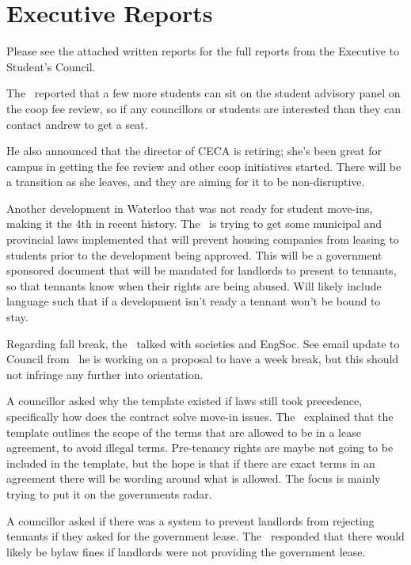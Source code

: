 \section*{Executive Reports}

Please see the attached written reports for the full reports from the Executive
to Student's Council. 

\begin{information}

    The \vpe\ reported that a few more students can sit on the student advisory
    panel on the coop fee review, so if any councillors or students 
    are interested than they can contact andrew to get a seat.

    He also announced that the director of CECA is retiring; she's been great 
    for campus in getting the fee review and other coop initiatives started. 
    There will be a transition as she leaves, and they are aiming for it to be
    non-disruptive.

    Another development in Waterloo that was not ready for student move-ins,
    making it the 4th in recent history. The \vpe\ is trying to get
    some municipal and provincial laws implemented that will prevent housing
    companies from leasing to students prior to the development being approved. 
    This will be a government sponsored document that will be mandated for 
    landlords to present to tennants, so that tennants know when their rights 
    are being abused. Will likely include language such that if a development 
    isn't ready a tennant won't be bound to stay.

    Regarding fall break, the \vped\ talked with societies and EngSoc. See 
    email update to Council from \andrewc\, he is working on a proposal to 
    have a week break, but this should not infringe any further into 
    orientation. 

    A councillor asked why the template existed if laws still took precedence,  
    specifically how does the contract solve move-in issues. 
    The \vpe\ explained that the template outlines the scope of the terms
    that are allowed to be in a lease agreement, to avoid illegal terms.
    Pre-tenancy rights are maybe not going to be included in the template, but 
    the hope is that if there are exact terms in an agreement there will be
    wording around what is allowed. The focus is mainly trying to put it on the
    governments radar. 

    A councillor asked if there was a system to prevent landlords from
    rejecting tennants if they asked for the government lease. The \vpe\
    responded that there would likely be bylaw fines if landlords were not
    providing the government lease. 


\end{information}
